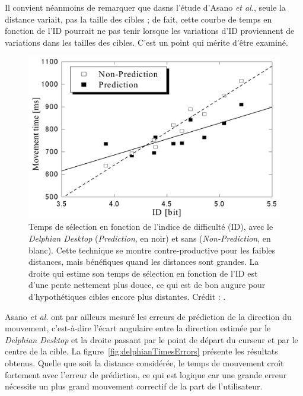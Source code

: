 	Il convient néanmoins de remarquer que dasns l'étude d'Asano \emph{et al.}, seule la distance variait, pas la taille des cibles ; de fait, cette courbe de temps en fonction de l'ID pourrait ne pas tenir lorsque les variations d'ID proviennent de variations dans les tailles des cibles. C'est un point qui mérite d'être examiné.

	\begin{figure}[H]
		\centering
		\includegraphics[width=\textwidth]{figures/ch2/delphianTimesID}
		\caption[\emph{Delphian Desktop} --- temps de sélection en fonction de l'ID]{Temps de sélection en fonction de l'indice de difficulté (ID), avec le \emph{Delphian Desktop} (\emph{Prediction}, en noir) et sans (\emph{Non-Prediction}, en blanc). Cette technique se montre contre-productive pour les faibles distances, mais bénéfiques quand les distances sont grandes. La droite qui estime son temps de sélection en fonction de l'ID est d'une pente nettement plus douce, ce qui est de bon augure pour d'hypothétiques cibles encore plus distantes. Crédit : \cite{asano2005predictive}.}
		\label{fig:delphianTimesID}
	\end{figure}
	
	Asano \emph{et al.} ont par ailleurs mesuré les erreurs de prédiction de la direction du mouvement, c'est-à-dire l'écart angulaire entre la direction estimée par le \emph{Delphian Desktop} et la droite passant par le point de départ du curseur et par le centre de la cible. La figure~\ref{fig:delphianTimesErrors} présente les résultats obtenus. Quelle que soit la distance considérée, le temps de mouvement croît fortement avec l'erreur de prédiction, ce qui est logique car une grande erreur nécessite un plus grand mouvement correctif de la part de l'utilisateur.
	
